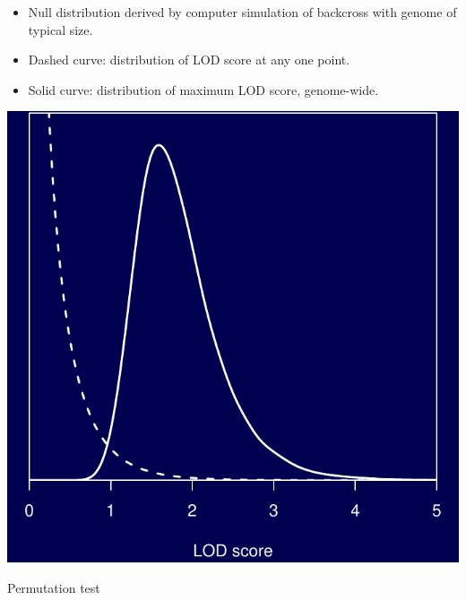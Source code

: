 \documentclass[12pt]{article}
\newcommand{\headsize}{\fontsize{35}{35} \selectfont}
\newcommand{\smallersize}{\fontsize{20}{25} \selectfont}
\begin{document}
\hspace*{0.5in}
\begin{minipage}[t]{4.7in}
\vspace*{10mm}

\color{mywhite} \smallersize
\begin{itemize}
\setlength{\rightskip}{0pt plus 1fil} %
\item Null distribution derived by computer simulation of backcross
with genome of typical size.
\item Dashed curve: distribution of LOD score at any one point.
\item Solid curve: distribution of maximum LOD score, genome-wide.
\end{itemize}
\end{minipage}
\hfill
\begin{minipage}[t]{4.7in}
\vspace*{0cm}

\includegraphics{FigsA/loddist.pdf}
\end{minipage}








\newpage

\headsize \color{myyellow}
\hfill \begin{minipage}{5.75in}
\centering
Permutation test
\end{minipage}
\end{document}
